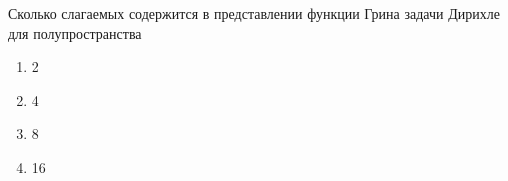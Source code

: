 Сколько слагаемых содержится в представлении функции Грина задачи Дирихле для полупространства

\begin{enumerate}[label=\arabic*)]
    \item 2
    \item 4
    \item 8
    \item 16
\end{enumerate}

